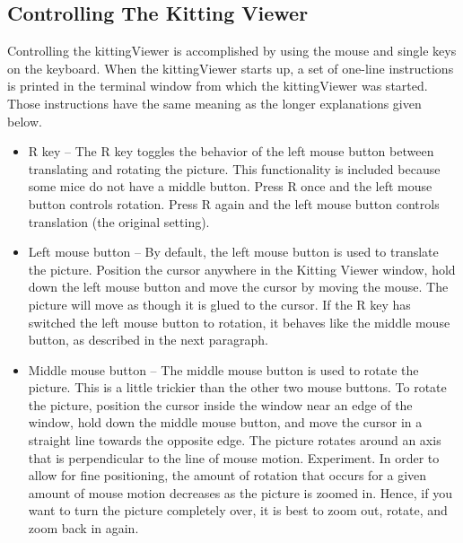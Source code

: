 \subsection{Controlling The Kitting Viewer}
Controlling the kittingViewer is accomplished by using the mouse and single
keys on the keyboard. When the kittingViewer starts up, a set of one-line
instructions is printed in the terminal window from which the
kittingViewer was started. Those instructions have the same meaning as
the longer explanations given below.\\

\begin{itemize}

\item R key -- The R key toggles the behavior of the left mouse button
  between translating and rotating the picture. This functionality is
  included because some mice do not have a middle button. Press R once and
  the left mouse button controls rotation. Press R again and the left
  mouse button controls translation (the original setting).\\

\item Left mouse button -- By default, the left mouse button is used to
  translate the picture. Position the cursor anywhere in the Kitting Viewer
  window, hold down the left mouse button and move the cursor by moving the
  mouse. The picture will move as though it is glued to the cursor. If the
  R key has switched the left mouse button to rotation, it behaves like the
  middle mouse button, as described in the next paragraph.\\

\item Middle mouse button -- The middle mouse button is used to rotate the
  picture. This is a little trickier than the other two mouse buttons. To
  rotate the picture, position the cursor inside the window near an edge of
  the window, hold down the middle mouse button, and move the cursor in a
  straight line towards the opposite edge. The picture rotates around an axis
  that is perpendicular to the line of mouse motion. Experiment. In order
  to allow for fine positioning, the amount of rotation that occurs for a
  given amount of mouse motion decreases as the picture is zoomed
  in. Hence, if you want to turn the picture completely over, it is best to
  zoom out, rotate, and zoom back in again.\\


\end{itemize}
